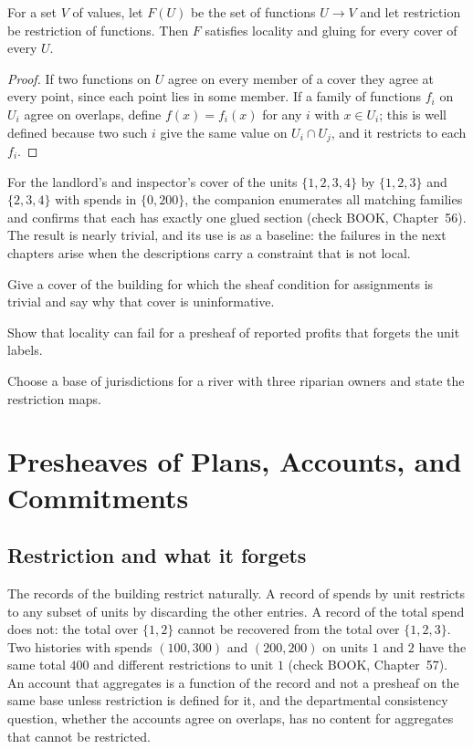 \begin{proposition}\label{prop:sheaf}
For a set $V$ of values, let $F(U)$ be the set of functions $U\to V$ and let restriction be restriction of functions. Then $F$ satisfies locality and gluing for every cover of every $U$.
\end{proposition}

\begin{proof}
If two functions on $U$ agree on every member of a cover they agree at every point, since each point lies in some member. If a family of functions $f_i$ on $U_i$ agree on overlaps, define $f(x)=f_i(x)$ for any $i$ with $x\in U_i$; this is well defined because two such $i$ give the same value on $U_i\cap U_j$, and it restricts to each $f_i$.
\end{proof}

For the landlord's and inspector's cover of the units $\{1,2,3,4\}$ by $\{1,2,3\}$ and $\{2,3,4\}$ with spends in $\{0,200\}$, the companion enumerates all matching families and confirms that each has exactly one glued section (check BOOK, Chapter~56). The result is nearly trivial, and its use is as a baseline: the failures in the next chapters arise when the descriptions carry a constraint that is not local.

\begin{exercise}Give a cover of the building for which the sheaf condition for assignments is trivial and say why that cover is uninformative.\end{exercise}
\begin{exercise}Show that locality can fail for a presheaf of reported profits that forgets the unit labels.\end{exercise}
\begin{exercise}Choose a base of jurisdictions for a river with three riparian owners and state the restriction maps.\end{exercise}

\chapter{Presheaves of Plans, Accounts, and Commitments}\label{ch:57}

\section{Restriction and what it forgets}

The records of the building restrict naturally. A record of spends by unit restricts to any subset of units by discarding the other entries. A record of the total spend does not: the total over $\{1,2\}$ cannot be recovered from the total over $\{1,2,3\}$. Two histories with spends $(100,300)$ and $(200,200)$ on units $1$ and $2$ have the same total $400$ and different restrictions to unit $1$ (check BOOK, Chapter~57). An account that aggregates is a function of the record and not a presheaf on the same base unless restriction is defined for it, and the departmental consistency question, whether the accounts agree on overlaps, has no content for aggregates that cannot be restricted.

